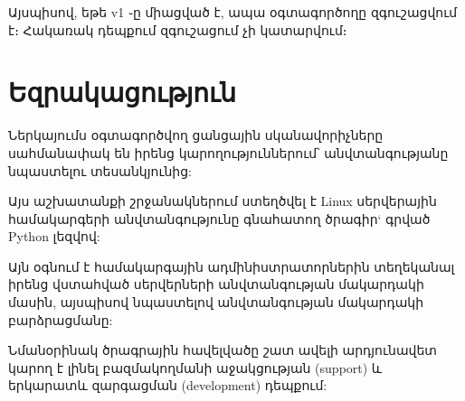 \documentclass[a4paper,12pt]{article}
\begin{document}
\begin{sloppypar}
Այսպիսով, եթե v1 ֊ը միացված է, ապա օգտագործողը զգուշացվում է։
Հակառակ դեպքում զգուշացում չի կատարվում։


\newpage
\section{Եզրակացություն}


Ներկայումս օգտագործվող ցանցային սկանավորիչները սահմանափակ են
իրենց կարողություններում՝ անվտանգությանը նպաստելու
տեսանկյունից:

Այս աշխատանքի շրջանակներում ստեղծվել է Linux սերվերային
համակարգերի անվտանգությունը գնահատող
ծրագիր` գրված Python լեզվով:

Այն օգնում է համակարգային ադմինիստրատորներին տեղեկանալ
իրենց վստահված սերվերների անվտանգության մակարդակի մասին,
այսպիսով նպաստելով անվտանգության մակարդակի բարձրացմանը:

Նմանօրինակ ծրագրային հավելվածը շատ ավելի արդյունավետ կարող է
լինել բազմակողմանի աջակցության (support) և երկարատև զարգացման
(development) դեպքում:


\newpage

\end{sloppypar}
\end{document}

